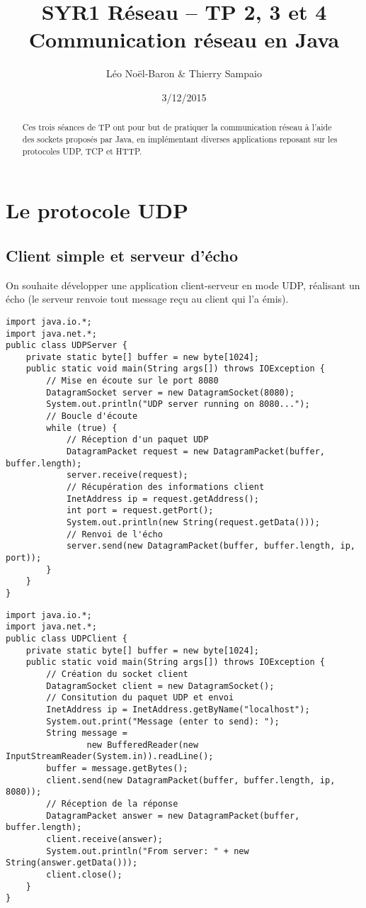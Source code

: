 \documentclass[a4paper]{article}
\title{SYR1 Réseau -- TP 2, 3 et 4\\Communication réseau en Java}
\author{Léo Noël-Baron \& Thierry Sampaio}
\date{3/12/2015}
\begin{document}
\maketitle

\begin{abstract}
Ces trois séances de TP ont pour but de pratiquer la communication réseau à l'aide des sockets proposés par Java, en implémentant diverses applications reposant sur les protocoles UDP, TCP et HTTP.
\end{abstract}
\section{Le protocole UDP}

\subsection{Client simple et serveur d'écho}

On souhaite développer une application client-serveur en mode UDP, réalisant un écho (le serveur renvoie tout message reçu au client qui l'a émis).

\begin{lstlisting}
import java.io.*;
import java.net.*;
public class UDPServer {
	private static byte[] buffer = new byte[1024];
	public static void main(String args[]) throws IOException {
		// Mise en écoute sur le port 8080
		DatagramSocket server = new DatagramSocket(8080);
        System.out.println("UDP server running on 8080...");
		// Boucle d'écoute
		while (true) {
			// Réception d'un paquet UDP
			DatagramPacket request = new DatagramPacket(buffer, buffer.length);
			server.receive(request);
			// Récupération des informations client
			InetAddress ip = request.getAddress();
			int port = request.getPort();
			System.out.println(new String(request.getData()));
			// Renvoi de l'écho
			server.send(new DatagramPacket(buffer, buffer.length, ip, port));
		}
	}
}
\end{lstlisting}

\begin{lstlisting}
import java.io.*;
import java.net.*;
public class UDPClient {
	private static byte[] buffer = new byte[1024];
	public static void main(String args[]) throws IOException {
		// Création du socket client
		DatagramSocket client = new DatagramSocket();
		// Consitution du paquet UDP et envoi
		InetAddress ip = InetAddress.getByName("localhost");
		System.out.print("Message (enter to send): ");
		String message =
				new BufferedReader(new InputStreamReader(System.in)).readLine();
		buffer = message.getBytes();
		client.send(new DatagramPacket(buffer, buffer.length, ip, 8080));
		// Réception de la réponse
		DatagramPacket answer = new DatagramPacket(buffer, buffer.length);
		client.receive(answer);
		System.out.println("From server: " + new String(answer.getData()));
		client.close();
	}
}
\end{lstlisting}
\end{document}
